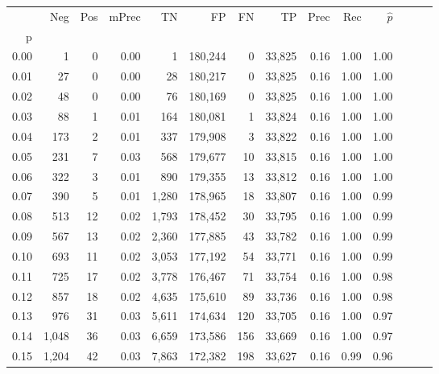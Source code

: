 \begin{tabular}{rrrrrrrrrrrrrr}
\toprule
{} &    Neg &  Pos & mPrec &       TN &       FP &      FN &      TP &  Prec &   Rec & $\hat{p}$ \\
p    &        &      &       &          &          &         &         &       &       &           \\
\midrule
0.00 &      1 &    0 &  0.00 &        1 &  180,244 &       0 &  33,825 &  0.16 &  1.00 &      1.00 \\
0.01 &     27 &    0 &  0.00 &       28 &  180,217 &       0 &  33,825 &  0.16 &  1.00 &      1.00 \\
0.02 &     48 &    0 &  0.00 &       76 &  180,169 &       0 &  33,825 &  0.16 &  1.00 &      1.00 \\
0.03 &     88 &    1 &  0.01 &      164 &  180,081 &       1 &  33,824 &  0.16 &  1.00 &      1.00 \\
0.04 &    173 &    2 &  0.01 &      337 &  179,908 &       3 &  33,822 &  0.16 &  1.00 &      1.00 \\
0.05 &    231 &    7 &  0.03 &      568 &  179,677 &      10 &  33,815 &  0.16 &  1.00 &      1.00 \\
0.06 &    322 &    3 &  0.01 &      890 &  179,355 &      13 &  33,812 &  0.16 &  1.00 &      1.00 \\
0.07 &    390 &    5 &  0.01 &    1,280 &  178,965 &      18 &  33,807 &  0.16 &  1.00 &      0.99 \\
0.08 &    513 &   12 &  0.02 &    1,793 &  178,452 &      30 &  33,795 &  0.16 &  1.00 &      0.99 \\
0.09 &    567 &   13 &  0.02 &    2,360 &  177,885 &      43 &  33,782 &  0.16 &  1.00 &      0.99 \\
0.10 &    693 &   11 &  0.02 &    3,053 &  177,192 &      54 &  33,771 &  0.16 &  1.00 &      0.99 \\
0.11 &    725 &   17 &  0.02 &    3,778 &  176,467 &      71 &  33,754 &  0.16 &  1.00 &      0.98 \\
0.12 &    857 &   18 &  0.02 &    4,635 &  175,610 &      89 &  33,736 &  0.16 &  1.00 &      0.98 \\
0.13 &    976 &   31 &  0.03 &    5,611 &  174,634 &     120 &  33,705 &  0.16 &  1.00 &      0.97 \\
0.14 &  1,048 &   36 &  0.03 &    6,659 &  173,586 &     156 &  33,669 &  0.16 &  1.00 &      0.97 \\
0.15 &  1,204 &   42 &  0.03 &    7,863 &  172,382 &     198 &  33,627 &  0.16 &  0.99 &      0.96 \\

\end{tabular}
